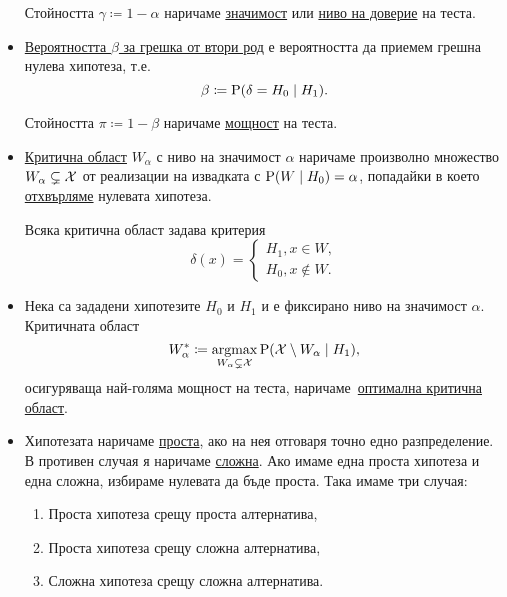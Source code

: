 \documentclass[numbers=endperiod, DIV=15, bibliography=totocnumbered]{scrartcl}
\begin{document}
\begin{definition}[Хипотези]
\begin{itemize}
    Стойността $\gamma \coloneqq 1 - \alpha$ наричаме \uline{значимост} или \uline{ниво на доверие} на теста.

    \item \uline{Вероятността $\beta$ за грешка от втори род} е вероятността да приемем грешна нулева хипотеза, т.е.
    \begin{displaymath}
      \beta \coloneqq \operatorname{P}(\delta = H_0 \mid H_1).
    \end{displaymath}

    Стойността $\pi \coloneqq 1 - \beta$ наричаме \uline{мощност} на теста.

    \item \uline{Критична област} $W_\alpha$ с ниво на значимост $\alpha$ наричаме произволно множество $W_\alpha \subsetneq \mathcal{X}$ от реализации на извадката с $\operatorname{P}(W \mid H_0) = \alpha$, попадайки в което \uline{отхвърляме} нулевата хипотеза.

    Всяка критична област задава критерия
    \begin{displaymath}
      \delta(x) = \begin{cases}
        H_1, x \in W, \\
        H_0, x \not\in W.
      \end{cases}
    \end{displaymath}

    \item Нека са зададени хипотезите $H_0$ и $H_1$ и е фиксирано ниво на значимост $\alpha$. Критичната област
    \begin{displaymath}
      W_\alpha^* \coloneqq \operatorname*{\operatorname{argmax}}_{W_\alpha \subsetneq \mathcal{X}} \operatorname{P}(\mathcal{X} \setminus W_\alpha \mid H_1),
    \end{displaymath}
    осигуряваща най-голяма мощност на теста, наричаме~\uline{оптимална критична област}.

    \item Хипотезата наричаме \uline{проста}, ако на нея отговаря точно едно разпределение. В противен случая я наричаме \uline{сложна}. Ако имаме една проста хипотеза и една сложна, избираме нулевата да бъде проста. Така имаме три случая:
    \begin{enumerate}
      \item Проста хипотеза срещу проста алтернатива,
      \item Проста хипотеза срещу сложна алтернатива,
      \item Сложна хипотеза срещу сложна алтернатива.
    \end{enumerate}


\end{itemize}
\end{definition}
\end{document}
